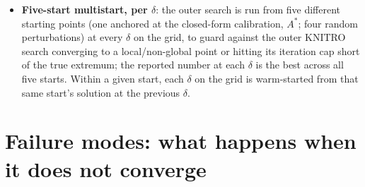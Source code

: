\documentclass[11pt]{article}
\begin{document}
\begin{itemize}
  \texttt{best\_feasible\_gravity\_ok} used to select the reported point; the two can disagree (a
  bounded, nonzero hard-max share-matching error at higher $\delta$ is expected and is not itself
  evidence of a problem; it does not gate or change \texttt{best\_feasible\_kappa}).
  \item \textbf{Five-start multistart, per $\delta$}: the outer search is run from five different
  starting points (one anchored at the closed-form calibration, $A^*$; four random perturbations)
  at every $\delta$ on the grid, to guard against the outer KNITRO search converging to a
  local/non-global point or hitting its iteration cap short of the true extremum; the reported
  number at each $\delta$ is the best across all five starts. Within a given start, each $\delta$ on
  the grid is warm-started from that same start's solution at the previous $\delta$.
\end{itemize}

\section{Failure modes: what happens when it does not converge}
\label{sec:failure}
\end{document}
